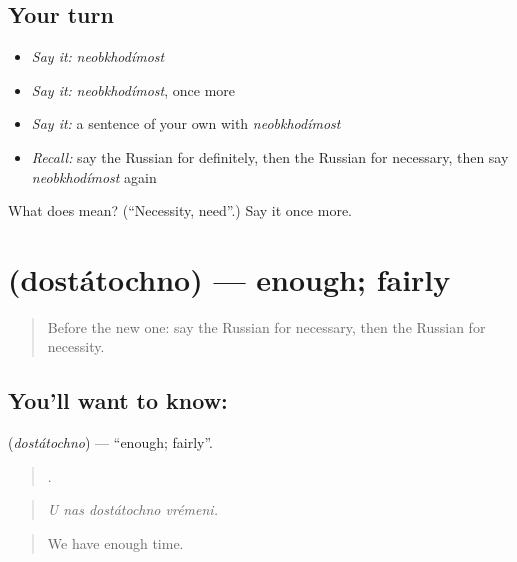 \subsection*{Your turn}
\begin{itemize}
\raggedright
  \item \emph{Say it:} \emph{neobkhodímost}
  \item \emph{Say it:} \emph{neobkhodímost}, once more
  \item \emph{Say it:} a sentence of your own with \emph{neobkhodímost}
  \item \emph{Recall:} say the Russian for definitely, then the Russian for necessary, then say \emph{neobkhodímost} again
\end{itemize}

\begin{tcolorbox}[breakable,colback=teal!4,colframe=teal!35!black,title={Before you move on}]
What does  mean? (\textquotedblleft{}Necessity, need\textquotedblright{}.) Say it once more.
\end{tcolorbox}
\section[\texorpdfstring{\ru{достаточно} (dostátochno)}{достаточно (dostátochno)}]{ (dostátochno) — enough; fairly}

\label{lesson:RU-C375-dostatochno}



\begin{quote}
Before the new one: say the Russian for necessary, then the Russian for necessity.
\end{quote}

\subsection*{You'll want to know: }
\textbf{} (\emph{dostátochno}) — \textquotedblleft{}enough; fairly\textquotedblright{}.

\begin{quote}
   .
\end{quote}

\begin{quote}
\emph{U nas dostátochno vrémeni.}
\end{quote}

\begin{quote}
We have enough time.
\end{quote}

